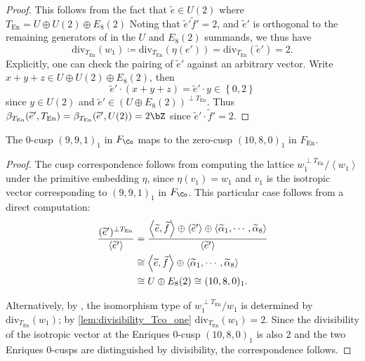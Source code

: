 \documentclass{amsart}
\renewcommand{\tilde}{\widetilde}
\begin{document}
\begin{proof}

This follows from the fact that \(\tilde e\in U(2)\) where \(T_{\operatorname{En}} = U \oplus U(2) \oplus E_8(2)\) Noting that \(\tilde e' \tilde f' = 2\), and \(\tilde e'\) is orthogonal to the remaining generators of in the \(U\) and \(E_8(2)\) summands, we thus have \[
\mathrm{div}_{T_{\operatorname{En}} }(w_1) \coloneqq\mathrm{div}_{T_{\operatorname{En}} }(\eta(e'))  
 = \mathrm{div}_{T_{\operatorname{En}} }(\tilde e') = 2
.\] Explicitly, one can check the pairing of \(\tilde e'\) against an arbitrary vector. Write \(x+y+z\in U \oplus U(2)\oplus E_8(2)\), then \[
\tilde e'\cdot(x+y+z) = \tilde e'\cdot y\in \left\{{0, 2}\right\}
\] since \(y\in U(2)\) and \(\tilde e'\in (U\oplus E_8(2))^{\perp T_{\operatorname{En}}}\). Thus \(\beta_{T_{\operatorname{En}}}(\tilde e', T_{\operatorname{En}}) = \beta_{T_{\operatorname{En}}}(\tilde e', U(2)) = 2\bZ\) since \(\tilde e'\cdot\tilde f' = 2\).

\end{proof}

\begin{lemma}

\label{lem:w1_perp_calculation} The 0-cusp \((9,9,1)_1\) in \(F_{\Co}\) maps to the zero-cusp \((10, 8, 0)_1\) in \(F_{\operatorname{En}}\).

\end{lemma}

\begin{proof}

The cusp correspondence follows from computing the lattice \(w_1^{\perp T_{\operatorname{En}}}/\left\langle{w_1}\right\rangle\) under the primitive embedding \(\eta\), since \(\eta(v_1) = w_1\) and \(v_1\) is the isotropic vector corresponding to \((9,9,1)_1\) in \(F_{\Co}\). This particular case follows from a direct computation: \begin{align*} { (\tilde e')^{\perp T_{\operatorname{En}}} \over \left\langle{\tilde e'}\right\rangle } &= { \left\langle{\tilde e,\tilde f}\right\rangle \oplus \left\langle{\tilde e'}\right\rangle \oplus \left\langle{\tilde \alpha_1, \cdots, \tilde \alpha_8}\right\rangle \over \left\langle{\tilde e'}\right\rangle } \\ &\cong \left\langle{\tilde e, \tilde f}\right\rangle \oplus \left\langle{\tilde \alpha_1, \cdots, \tilde \alpha_8}\right\rangle \\ &\cong U \oplus E_{8}(2)  \cong (10,8,0)_1 .\end{align*}

Alternatively, by \cite[Prop. 5.5]{AE22nonsympinv}, the isomorphism type of \(w_1^{\perp T_{\operatorname{En}}}/w_1\) is determined by \(\mathrm{div}_{T_{\operatorname{En}}}(w_1)\); by \cref{lem:divisibility_Tco_one} \(\mathrm{div}_{T_{\operatorname{En}}}(w_1) = 2\). Since the divisibility of the isotropic vector at the Enriques 0-cusp \((10, 8, 0)_1\) is also 2 and the two Enriques 0-cusps are distinguished by divisibility, the correspondence follows.

\end{proof}
\end{document}
